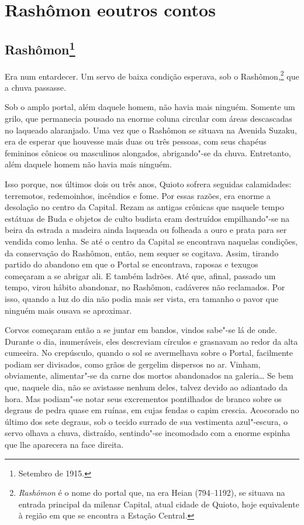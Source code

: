 \part[Rashômon e outros contos]{Rashômon e\break outros contos}

\chapter{Rashômon\footnote{Setembro de 1915.}}

\noindent{}Era num entardecer. Um servo de baixa condição esperava, sob o
Rashômon,\footnote{\textit{Rashômon} é o nome do portal que, na era Heian
(794--1192), se situava na entrada principal da milenar Capital, atual
cidade de Quioto, hoje equivalente à região em que se encontra a
Estação Central.} que a chuva passasse.

Sob o amplo portal, além daquele homem, não havia mais ninguém.
Somente um grilo, que permanecia pousado na enorme coluna circular
com áreas descascadas no laqueado alaranjado. Uma vez que o Rashômon se
situava na Avenida Suzaku, era de esperar que houvesse mais duas ou
três pessoas, com seus chapéus femininos cônicos ou masculinos
alongados, abrigando"-se da chuva. Entretanto, além daquele homem não
havia mais ninguém.

Isso porque, nos últimos dois ou três anos, Quioto sofrera seguidas
calamidades: terremotos, redemoinhos, incêndios e fome. Por essas
razões, era enorme a desolação no centro da Capital. Rezam as antigas
crônicas que naquele tempo estátuas de Buda e objetos de culto budista
eram destruídos empilhando"-se na beira da estrada a madeira ainda
laqueada ou folheada a ouro e prata para ser vendida como lenha. Se até
o centro da Capital se encontrava naquelas condições, da conservação do
Rashômon, então, nem sequer se cogitava. Assim, tirando partido do
abandono em que o Portal se encontrava, raposas e texugos começaram a
se abrigar ali. E também ladrões. Até que, afinal, passado um tempo,
virou hábito abandonar, no Rashômon, cadáveres não reclamados. Por
isso, quando a luz do dia não podia mais ser vista, era tamanho o pavor
que ninguém mais ousava se aproximar.

Corvos começaram então a se juntar em bandos, vindos sabe"-se lá de
onde. Durante o dia, inumeráveis, eles descreviam círculos e grasnavam
ao redor da alta cumeeira. No crepúsculo, quando o sol se avermelhava
sobre o Portal, facilmente podiam ser divisados, como grãos de gergelim
dispersos no ar. Vinham, obviamente, alimentar"-se da carne dos mortos
abandonados na galeria\ldots{} Se bem que, naquele dia, não se avistasse
nenhum deles, talvez devido ao adiantado da hora. Mas podiam"-se notar
seus excrementos pontilhados de branco sobre os degraus de pedra quase
em ruínas, em cujas fendas o capim crescia. Acocorado no último dos
sete degraus, sob o tecido surrado de sua vestimenta azul"-escura, o
servo olhava a chuva, distraído, sentindo"-se incomodado com a enorme
espinha que lhe aparecera na face direita.

